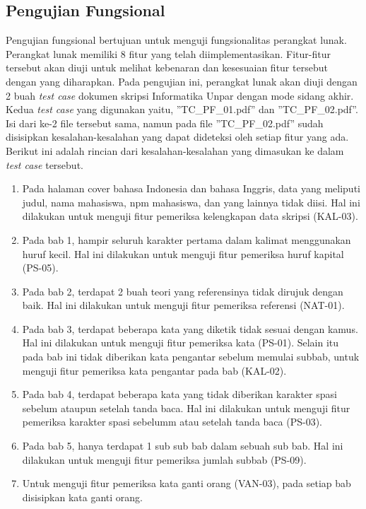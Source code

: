 \subsection{Pengujian Fungsional}
Pengujian fungsional bertujuan untuk menguji fungsionalitas perangkat lunak. Perangkat lunak memiliki 8 fitur yang telah diimplementasikan. Fitur-fitur tersebut akan diuji untuk melihat kebenaran dan kesesuaian fitur tersebut dengan yang diharapkan. Pada pengujian ini, perangkat lunak akan diuji dengan 2 buah \textit{test case} dokumen skripsi Informatika Unpar dengan mode sidang akhir. Kedua \textit{test case} yang digunakan yaitu, ''TC\_PF\_01.pdf'' dan ''TC\_PF\_02.pdf''. Isi dari ke-2 file tersebut sama, namun pada file ''TC\_PF\_02.pdf'' sudah disisipkan kesalahan-kesalahan yang dapat dideteksi oleh setiap fitur yang ada. Berikut ini adalah rincian dari kesalahan-kesalahan yang dimasukan ke dalam \textit{test case} tersebut.

\begin{enumerate}
	\item Pada halaman cover bahasa Indonesia dan bahasa Inggris, data yang meliputi judul, nama mahasiswa, npm mahasiswa, dan yang lainnya tidak diisi. Hal ini dilakukan untuk menguji fitur pemeriksa kelengkapan data skripsi (KAL-03).
	
	\item Pada bab 1, hampir seluruh karakter pertama dalam kalimat menggunakan huruf kecil. Hal ini dilakukan untuk menguji fitur pemeriksa huruf kapital (PS-05).
	
	\item Pada bab 2, terdapat 2 buah teori yang referensinya tidak dirujuk dengan baik. Hal ini dilakukan untuk menguji fitur pemeriksa referensi (NAT-01).
	
	\item Pada bab 3, terdapat beberapa kata yang diketik tidak sesuai dengan kamus. Hal ini dilakukan untuk menguji fitur pemeriksa kata (PS-01). Selain itu pada bab ini tidak diberikan kata pengantar sebelum memulai subbab, untuk menguji fitur pemeriksa kata pengantar pada bab (KAL-02).
	
	\item Pada bab 4, terdapat beberapa kata yang tidak diberikan karakter spasi sebelum ataupun setelah tanda baca. Hal ini dilakukan untuk menguji fitur pemeriksa karakter spasi sebelumm atau setelah tanda baca (PS-03).	

		\item Pada bab 5, hanya terdapat 1 sub sub bab dalam sebuah sub bab. Hal ini dilakukan untuk menguji fitur pemeriksa jumlah subbab (PS-09).	
		
	\item Untuk menguji fitur pemeriksa kata ganti orang (VAN-03), pada setiap bab disisipkan kata ganti orang.
\end{enumerate}

